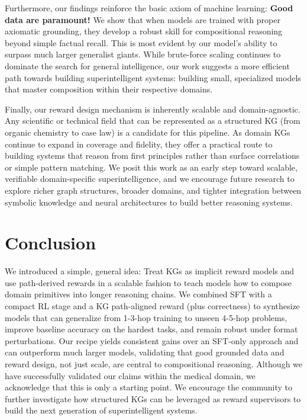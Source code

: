 \documentclass{article}
\theoremstyle{plain}
\theoremstyle{definition}
\theoremstyle{remark}
\begin{document}
Furthermore, our findings reinforce the basic axiom of machine learning: \textbf{Good data are paramount!} We show that when models are trained with proper axiomatic grounding, they develop a robust skill for compositional reasoning beyond simple factual recall. This is most evident by our model's ability to surpass much larger generalist giants. While brute-force scaling continues to dominate the search for general intelligence, our work suggests a more efficient path towards building superintelligent systems: building small, specialized models that master composition within their respective domains.

Finally, our reward design mechanism is inherently scalable and domain-agnostic. Any scientific or technical field that can be represented as a structured KG (from organic chemistry to case law) is a candidate for this pipeline. As domain KGs continue to expand in coverage and fidelity, they offer a practical route to building systems that reason from first principles rather than surface correlations or simple pattern matching. We posit this work as an early step toward scalable, verifiable domain-specific superintelligence, and we encourage future research to explore richer graph structures, broader domains, and tighter integration between symbolic knowledge and neural architectures to build better reasoning systems.

\section{Conclusion}
We introduced a simple, general idea: Treat KGs as implicit reward models and use path-derived rewards in a scalable fashion to teach models how to compose domain primitives into longer reasoning chains. We combined SFT with a compact RL stage and a KG path-aligned reward (plus correctness) to synthesize models that can generalize from 1-3-hop training to unseen 4-5-hop problems, improve baseline accuracy on the hardest tasks, and remain robust under format perturbations. Our recipe yields consistent gains over an SFT-only approach and can outperform much larger models, validating that good grounded data and reward design, not just scale, are central to compositional reasoning. Although we have successfully validated our claims within the medical domain, we acknowledge that this is only a starting point. We encourage the community to further investigate how structured KGs can be leveraged as reward supervisors to build the next generation of superintelligent systems.
\end{document}

